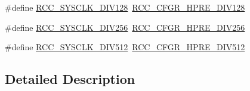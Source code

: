 \begin{DoxyCompactItemize}
\item 
\#define \hyperlink{group___r_c_c___a_h_b___clock___source_ga43eddf4d4160df30548a714dce102ad8}{R\-C\-C\-\_\-\-S\-Y\-S\-C\-L\-K\-\_\-\-D\-I\-V128}~\hyperlink{group___peripheral___registers___bits___definition_ga280da821f0da1bec1f4c0e132ddf8eab}{R\-C\-C\-\_\-\-C\-F\-G\-R\-\_\-\-H\-P\-R\-E\-\_\-\-D\-I\-V128}
\item 
\#define \hyperlink{group___r_c_c___a_h_b___clock___source_ga94956d6e9c3a78230bf660b838f987e2}{R\-C\-C\-\_\-\-S\-Y\-S\-C\-L\-K\-\_\-\-D\-I\-V256}~\hyperlink{group___peripheral___registers___bits___definition_ga089930cedd5b2cb201e717438f29d25b}{R\-C\-C\-\_\-\-C\-F\-G\-R\-\_\-\-H\-P\-R\-E\-\_\-\-D\-I\-V256}
\item 
\#define \hyperlink{group___r_c_c___a_h_b___clock___source_gabe18a9d55c0858bbfe3db657fb64c76d}{R\-C\-C\-\_\-\-S\-Y\-S\-C\-L\-K\-\_\-\-D\-I\-V512}~\hyperlink{group___peripheral___registers___bits___definition_gae5088dcbaefc55d4b6693e9b1e595ed0}{R\-C\-C\-\_\-\-C\-F\-G\-R\-\_\-\-H\-P\-R\-E\-\_\-\-D\-I\-V512}
\end{DoxyCompactItemize}


\subsection{Detailed Description}


